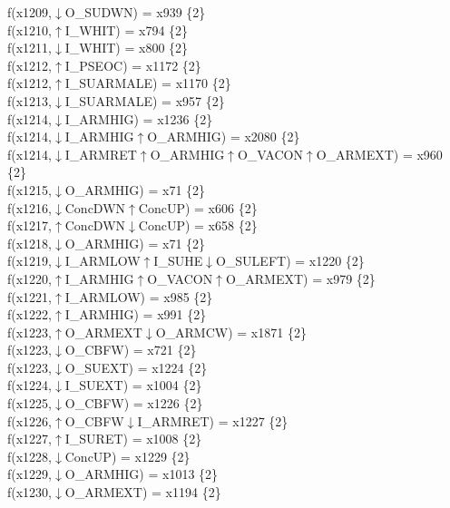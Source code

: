 f(x1209,$\downarrow$O\_SUDWN) = x939 \{2\} \\  
f(x1210,$\uparrow$I\_WHIT) = x794 \{2\} \\  
f(x1211,$\downarrow$I\_WHIT) = x800 \{2\} \\  
f(x1212,$\uparrow$I\_PSEOC) = x1172 \{2\} \\  
f(x1212,$\uparrow$I\_SUARMALE) = x1170 \{2\} \\  
f(x1213,$\downarrow$I\_SUARMALE) = x957 \{2\} \\  
f(x1214,$\downarrow$I\_ARMHIG) = x1236 \{2\} \\  
f(x1214,$\downarrow$I\_ARMHIG$\uparrow$O\_ARMHIG) = x2080 \{2\} \\  
f(x1214,$\downarrow$I\_ARMRET$\uparrow$O\_ARMHIG$\uparrow$O\_VACON$\uparrow$O\_ARMEXT) = x960 \{2\} \\  
f(x1215,$\downarrow$O\_ARMHIG) = x71 \{2\} \\  
f(x1216,$\downarrow$ConcDWN$\uparrow$ConcUP) = x606 \{2\} \\  
f(x1217,$\uparrow$ConcDWN$\downarrow$ConcUP) = x658 \{2\} \\  
f(x1218,$\downarrow$O\_ARMHIG) = x71 \{2\} \\  
f(x1219,$\downarrow$I\_ARMLOW$\uparrow$I\_SUHE$\downarrow$O\_SULEFT) = x1220 \{2\} \\  
f(x1220,$\uparrow$I\_ARMHIG$\uparrow$O\_VACON$\uparrow$O\_ARMEXT) = x979 \{2\} \\  
f(x1221,$\uparrow$I\_ARMLOW) = x985 \{2\} \\  
f(x1222,$\uparrow$I\_ARMHIG) = x991 \{2\} \\  
f(x1223,$\uparrow$O\_ARMEXT$\downarrow$O\_ARMCW) = x1871 \{2\} \\  
f(x1223,$\downarrow$O\_CBFW) = x721 \{2\} \\  
f(x1223,$\downarrow$O\_SUEXT) = x1224 \{2\} \\  
f(x1224,$\downarrow$I\_SUEXT) = x1004 \{2\} \\  
f(x1225,$\downarrow$O\_CBFW) = x1226 \{2\} \\  
f(x1226,$\uparrow$O\_CBFW$\downarrow$I\_ARMRET) = x1227 \{2\} \\  
f(x1227,$\uparrow$I\_SURET) = x1008 \{2\} \\  
f(x1228,$\downarrow$ConcUP) = x1229 \{2\} \\  
f(x1229,$\downarrow$O\_ARMHIG) = x1013 \{2\} \\  
f(x1230,$\downarrow$O\_ARMEXT) = x1194 \{2\} \\  

